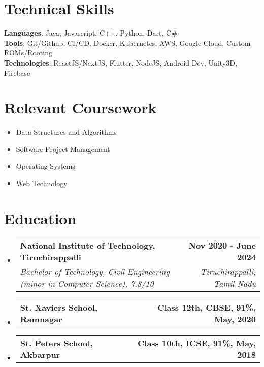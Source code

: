 \documentclass[letterpaper,11pt]{article}
\makeatletter
\newcommand{\resumeSubheading}[4]{
  \vspace{-2pt}\item
    \begin{tabular*}{1.0\textwidth}[t]{l@{\extracolsep{\fill}}r}
      \textbf{#1} & \textbf{\small #2} \\
      \textit{\small#3} & \textit{\small #4} \\
    \end{tabular*}\vspace{-8pt}
}
\newcommand{\eduSubheading}[2]{
  \vspace{-2pt}\item
    \begin{tabular*}{1.0\textwidth}[t]{l@{\extracolsep{\fill}}r}
      \textbf{#1} & \textbf{\small #2} \\
    \end{tabular*}\vspace{-8pt}
}
\newcommand{\resumeSubHeadingListStart}{\begin{itemize}[leftmargin=0.0in, label={}]}
\newcommand{\resumeSubHeadingListEnd}{\end{itemize}}
\makeatother
\begin{document}
\section{Technical Skills}
 \begin{itemize}[leftmargin=0.15in, label={}]
    \small{\item{
     \textbf{Languages}{: Java, Javascript, C++, Python, Dart, C\# } \\
     \textbf{Tools}{: Git/Github, CI/CD,  Docker, Kubernetes, AWS, Google Cloud, Custom ROMs/Rooting} \\
     \textbf{Technologies}{: ReactJS/NextJS, Flutter, NodeJS, Android Dev, Unity3D, Firebase } \\
    }}
 \end{itemize}
 \vspace{-20pt}

\section{Relevant Coursework}
        \begin{multicols}{4}
            \begin{itemize}[itemsep=-5pt, parsep=10pt]
                \item Data Structures and Algorithms
                \item Software Project Management
                \item Operating Systems
                \item Web Technology
            \end{itemize}
        \end{multicols}
        \vspace*{2.0\multicolsep}

\section{Education}
  \resumeSubHeadingListStart
    \resumeSubheading
      {National Institute of Technology, Tiruchirappalli}{Nov 2020 - June 2024}
      {Bachelor of Technology, Civil Engineering (minor in Computer Science), 7.8/10}{Tiruchirappalli, Tamil Nadu}
  \resumeSubHeadingListEnd
  \resumeSubHeadingListStart
    \eduSubheading
      {St. Xavier\textquotesingle{}s School, Ramnagar}{Class 12th, CBSE, 91\%, May, 2020}
  \resumeSubHeadingListEnd
  \resumeSubHeadingListStart
    \eduSubheading
      {St. Peter\textquotesingle{}s School, Akbarpur}{Class 10th, ICSE, 91\%, May, 2018}
  \resumeSubHeadingListEnd
\end{document}
